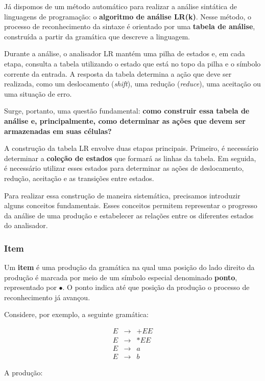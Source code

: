 \documentclass[
  brazilian,
  letterpaper,
]{book}
\theoremstyle{plain}
\theoremstyle{definition}
\theoremstyle{remark}
\begin{document}
Já dispomos de um método automático para realizar a análise sintática de
linguagens de programação: o \textbf{algoritmo de análise LR(k)}. Nesse
método, o processo de reconhecimento da sintaxe é orientado por uma
\textbf{tabela de análise}, construída a partir da gramática que
descreve a linguagem.

Durante a análise, o analisador LR mantém uma pilha de estados e, em
cada etapa, consulta a tabela utilizando o estado que está no topo da
pilha e o símbolo corrente da entrada. A resposta da tabela determina a
ação que deve ser realizada, como um deslocamento (\emph{shift}), uma
redução (\emph{reduce}), uma aceitação ou uma situação de erro.

Surge, portanto, uma questão fundamental: \textbf{como construir essa
tabela de análise e, principalmente, como determinar as ações que devem
ser armazenadas em suas células?}

A construção da tabela LR envolve duas etapas principais. Primeiro, é
necessário determinar a \textbf{coleção de estados} que formará as
linhas da tabela. Em seguida, é necessário utilizar esses estados para
determinar as ações de deslocamento, redução, aceitação e as transições
entre estados.

Para realizar essa construção de maneira sistemática, precisamos
introduzir alguns conceitos fundamentais. Esses conceitos permitem
representar o progresso da análise de uma produção e estabelecer as
relações entre os diferentes estados do analisador.

\subsubsection{Item}\label{item}

Um \textbf{item} é uma produção da gramática na qual uma posição do lado
direito da produção é marcada por meio de um símbolo especial denominado
\textbf{ponto}, representado por \(\bullet\). O ponto indica até que
posição da produção o processo de reconhecimento já avançou.

Considere, por exemplo, a seguinte gramática:

\[
\begin{array}{rcl}
E &\rightarrow& +EE\\
E &\rightarrow& *EE\\
E &\rightarrow& a\\
E &\rightarrow& b
\end{array}
\]

A produção:
\end{document}
